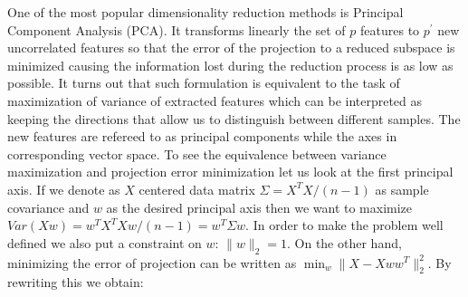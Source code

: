\documentclass[12pt, wide]{mwart}
\begin{document}
One of the most popular dimensionality reduction methods is Principal Component Analysis (PCA). It transforms linearly the set of $p$ features to $p^{\prime}$ new uncorrelated features so that the error of the projection to a reduced subspace is minimized causing the information lost during the reduction process is as low as possible. It turns out that such formulation is equivalent to the task of maximization of variance of extracted features which can be interpreted as keeping the directions that allow us to distinguish between different samples. The new features are refereed to as principal components while the axes in corresponding vector space. To see the equivalence between variance maximization and projection error minimization let us look at the first principal axis. If we denote as $X$ centered data matrix $\Sigma = X^TX/(n-1)$ as sample covariance and $w$ as the desired principal axis then we want to maximize $Var(Xw) = w^TX^TXw/(n-1) = w^T\Sigma w$. In order to make the problem well defined we also put a constraint on $w$: $\|w\|_2 = 1$. On the other hand, minimizing the error of projection can be written as $\min_w \| X - X ww^T\|_2^2$. By rewriting this we obtain: 
\end{document}
